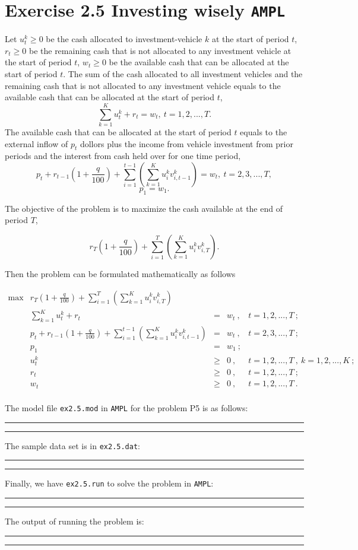 \section{Exercise 2.5 Investing wisely {\tt AMPL}}

Let $u_{t}^k \geq 0$ be the cash allocated to investment-vehicle $k$ at the start of period $t$, $r_{t} \geq 0$ be the remaining cash that is not allocated to any investment vehicle at the start of period $t$, $w_{t} \geq 0$ be the available cash that can be allocated at the start of period $t$. The sum of the cash allocated to all investment vehicles and the remaining cash that is not allocated to any investment vehicle equals to the available cash that can be allocated at the start of period $t$, $$ \sum_{k=1}^{K} u_{t}^k + r_t = w_t,~t=1,2,...,T.$$ The available cash that can be allocated at the start of period $t$ equals to the external inflow of $p_t$ dollors plus the income from vehicle investment from prior periods and the interest from cash held over for one time period, $$p_t + r_{t-1} (1+\frac{q}{100}) + \sum_{i=1}^{t-1}\left(\sum_{k=1}^K u_{i}^kv_{i,t-1}^k\right) = w_t,~t=2,3,...,T,$$ $$p_1 = w_1.$$

The objective of the problem is to maximize the cash available at the end of period $T$,

$$r_{T} (1+\frac{q}{100}) + \sum_{i=1}^{T}\left(\sum_{k=1}^K u_{i}^kv_{i,T}^k\right).$$

Then the problem can be formulated mathematically as follows

\[
\begin{array}{rrcll}
\tag{P5}
 \max & r_{T} (1+\frac{q}{100}) + \sum_{i=1}^{T}\left(\sum_{k=1}^K u_{i}^kv_{i,T}^k\right)  &  &   & \\
      &  \sum_{k=1}^{K} u_{t}^k + r_t & = & w_t~,  &t=1,2,...,T~; \\
      &  p_t + r_{t-1} (1+\frac{q}{100}) + \sum_{i=1}^{t-1}\left(\sum_{k=1}^K u_{i}^kv_{i,t-1}^k\right) & = & w_t~,& t=2,3,...,T~;\\
      &  p_1  & = & w_1~; & \\
      &  u_{t}^k & \geq & 0~, & t = 1,2,...,T~,~k=1,2,...,K~;\\
      &  r_t & \geq & 0~, & t = 1,2,...,T~; \\
      &  w_t & \geq & 0~, & t = 1,2,...,T~.\\
\end{array}
\]

The model file {\tt ex2.5.mod} in {\tt AMPL} for the problem P5 is as follows:

\bigskip
\hrule
\small

\normalsize
\hrule
\bigskip

The sample data set is in {\tt ex2.5.dat}:

\bigskip
\hrule
\small

\normalsize
\hrule
\bigskip

Finally, we have {\tt ex2.5.run} to solve the problem in {\tt AMPL}:

\bigskip
\hrule
\small

\normalsize
\hrule
\bigskip

The output of running the problem is:

\bigskip
\hrule
\small

\normalsize
\hrule
\bigskip


